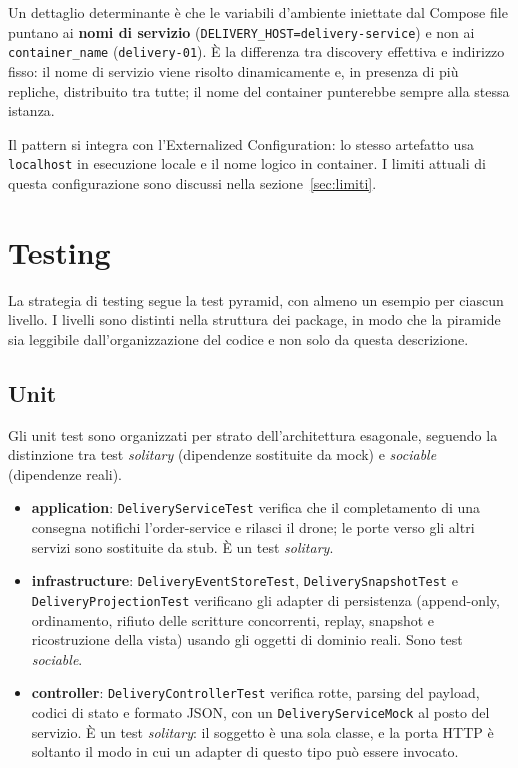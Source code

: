 \documentclass[12pt,a4paper]{article}
\begin{document}
Un dettaglio determinante \`e che le variabili d'ambiente iniettate dal Compose file puntano ai
\textbf{nomi di servizio} (\texttt{DELIVERY\_HOST=delivery-service}) e non ai
\texttt{container\_name} (\texttt{delivery-01}). \`E la differenza tra discovery effettiva e indirizzo
fisso: il nome di servizio viene risolto dinamicamente e, in presenza di pi\`u repliche, distribuito
tra tutte; il nome del container punterebbe sempre alla stessa istanza.

Il pattern si integra con l'Externalized Configuration: lo stesso artefatto usa \texttt{localhost} in
esecuzione locale e il nome logico in container. I limiti attuali di questa configurazione sono
discussi nella sezione~\ref{sec:limiti}.

\section{Testing}

La strategia di testing segue la test pyramid, con almeno un esempio per ciascun livello. I livelli
sono distinti nella struttura dei package, in modo che la piramide sia leggibile dall'organizzazione
del codice e non solo da questa descrizione.

\subsection{Unit}

Gli unit test sono organizzati per strato dell'architettura esagonale, seguendo la distinzione tra
test \emph{solitary} (dipendenze sostituite da mock) e \emph{sociable} (dipendenze reali).

\begin{itemize}
  \item \textbf{application}: \texttt{DeliveryServiceTest} verifica che il completamento di una
        consegna notifichi l'order-service e rilasci il drone; le porte verso gli altri servizi sono
        sostituite da stub. \`E un test \emph{solitary}.
  \item \textbf{infrastructure}: \texttt{DeliveryEventStoreTest}, \texttt{DeliverySnapshotTest} e
        \texttt{DeliveryProjectionTest} verificano gli adapter di persistenza (append-only,
        ordinamento, rifiuto delle scritture concorrenti, replay, snapshot e ricostruzione della
        vista) usando gli oggetti di dominio reali. Sono test \emph{sociable}.
  \item \textbf{controller}: \texttt{DeliveryControllerTest} verifica rotte, parsing del payload,
        codici di stato e formato JSON, con un \texttt{DeliveryServiceMock} al posto del servizio.
        \`E un test \emph{solitary}: il soggetto \`e una sola classe, e la porta HTTP \`e soltanto il
        modo in cui un adapter di questo tipo pu\`o essere invocato.
\end{itemize}
\end{document}
